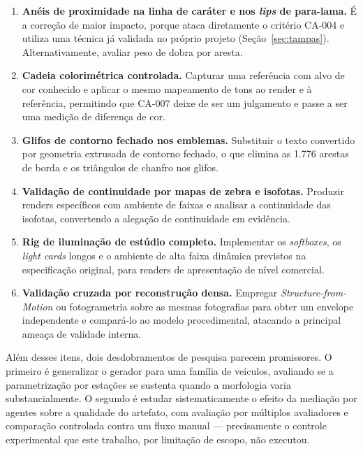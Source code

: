 \begin{enumerate}[label=\arabic*),leftmargin=1.4cm]
  \item \textbf{An\'eis de proximidade na linha de car\'ater e nos \emph{lips} de
        para-lama.} \'E a corre{\c{c}}\~ao de maior impacto, porque ataca diretamente o
        crit\'erio CA-004 e utiliza uma t\'ecnica j\'a validada no pr\'oprio projeto
        (Se{\c{c}}\~ao~\ref{sec:tampas}). Alternativamente, avaliar peso de dobra por
        aresta.
  \item \textbf{Cadeia colorim\'etrica controlada.} Capturar uma refer\^encia com alvo de
        cor conhecido e aplicar o mesmo mapeamento de tons ao render e \`a
        refer\^encia, permitindo que CA-007 deixe de ser um julgamento e passe a ser
        uma medi{\c{c}}\~ao de diferen{\c{c}}a de cor.
  \item \textbf{Glifos de contorno fechado nos emblemas.} Substituir o texto convertido
        por geometria extrusada de contorno fechado, o que elimina as 1.776 arestas de
        borda e os tri\^angulos de chanfro nos glifos.
  \item \textbf{Valida{\c{c}}\~ao de continuidade por mapas de zebra e isofotas.} Produzir
        renders espec\'ificos com ambiente de faixas e analisar a continuidade das
        isofotas, convertendo a alega{\c{c}}\~ao de continuidade em evid\^encia.
  \item \textbf{Rig de ilumina{\c{c}}\~ao de est\'udio completo.} Implementar os
        \emph{softboxes}, os \emph{light cards} longos e o ambiente de alta faixa
        din\^amica previstos na especifica{\c{c}}\~ao original, para renders de
        apresenta{\c{c}}\~ao de n\'ivel comercial.
  \item \textbf{Valida{\c{c}}\~ao cruzada por reconstru{\c{c}}\~ao densa.} Empregar
        \emph{Structure-from-Motion} ou fotogrametria sobre as mesmas fotografias para
        obter um envelope independente e compar\'a-lo ao modelo procedimental, atacando
        a principal amea{\c{c}}a de validade interna.
\end{enumerate}

Al\'em desses itens, dois desdobramentos de pesquisa parecem promissores. O primeiro \'e
generalizar o gerador para uma fam\'ilia de ve\'iculos, avaliando se a parametriza{\c{c}}\~ao
por esta{\c{c}}\~oes se sustenta quando a morfologia varia substancialmente. O segundo \'e
estudar sistematicamente o efeito da media{\c{c}}\~ao por agentes sobre a qualidade do
artefato, com avalia{\c{c}}\~ao por m\'ultiplos avaliadores e compara{\c{c}}\~ao
controlada contra um fluxo manual --- precisamente o controle experimental que este
trabalho, por limita{\c{c}}\~ao de escopo, n\~ao executou.


